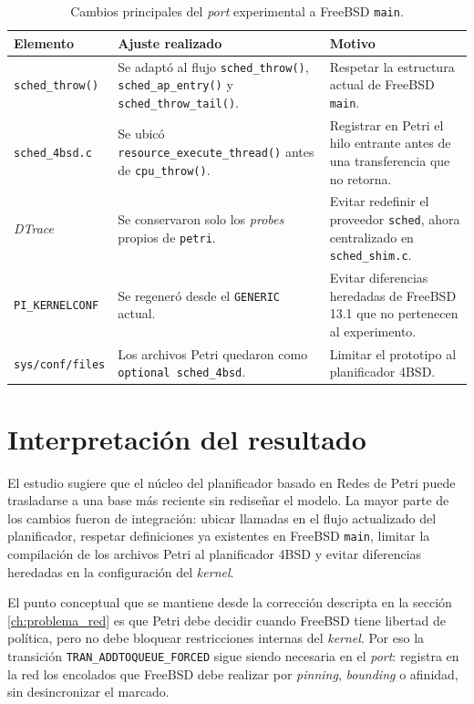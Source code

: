\begin{table}[H]
    \centering
    \small
    \setlength{\tabcolsep}{4pt}
    \begin{tabular}{|p{}|p{}|p{}|}
        \hline
        \textbf{Elemento} & \textbf{Ajuste realizado} & \textbf{Motivo} \\
        \hline
        \verb|sched_throw()| & Se adaptó al flujo \verb|sched_throw()|, \verb|sched_ap_entry()| y \verb|sched_throw_tail()|. & Respetar la estructura actual de FreeBSD \texttt{main}. \\
        \hline
        \verb|sched_4bsd.c| & Se ubicó \verb|resource_execute_thread()| antes de \verb|cpu_throw()|. & Registrar en Petri el hilo entrante antes de una transferencia que no retorna. \\
        \hline
        \textit{DTrace} & Se conservaron solo los \textit{probes} propios de \verb|petri|. & Evitar redefinir el proveedor \verb|sched|, ahora centralizado en \verb|sched_shim.c|. \\
        \hline
        \verb|PI_KERNELCONF| & Se regeneró desde el \verb|GENERIC| actual. & Evitar diferencias heredadas de FreeBSD 13.1 que no pertenecen al experimento. \\
        \hline
        \verb|sys/conf/files| & Los archivos Petri quedaron como \verb|optional sched_4bsd|. & Limitar el prototipo al planificador 4BSD. \\
        \hline
    \end{tabular}
    \caption{Cambios principales del \textit{port} experimental a FreeBSD \texttt{main}.}
    \label{tabla:port-main-cambios}
\end{table}

\section{Interpretación del resultado}

El estudio sugiere que el núcleo del planificador basado en Redes de Petri puede trasladarse a una base más reciente sin rediseñar el modelo. La mayor parte de los cambios fueron de integración: ubicar llamadas en el flujo actualizado del planificador, respetar definiciones ya existentes en FreeBSD \texttt{main}, limitar la compilación de los archivos Petri al planificador 4BSD y evitar diferencias heredadas en la configuración del \textit{kernel}.\par

El punto conceptual que se mantiene desde la corrección descripta en la sección \ref{ch:problema_red} es que Petri debe decidir cuando FreeBSD tiene libertad de política, pero no debe bloquear restricciones internas del \textit{kernel}. Por eso la transición \verb|TRAN_ADDTOQUEUE_FORCED| sigue siendo necesaria en el \textit{port}: registra en la red los encolados que FreeBSD debe realizar por \textit{pinning}, \textit{bounding} o afinidad, sin desincronizar el marcado.\par

